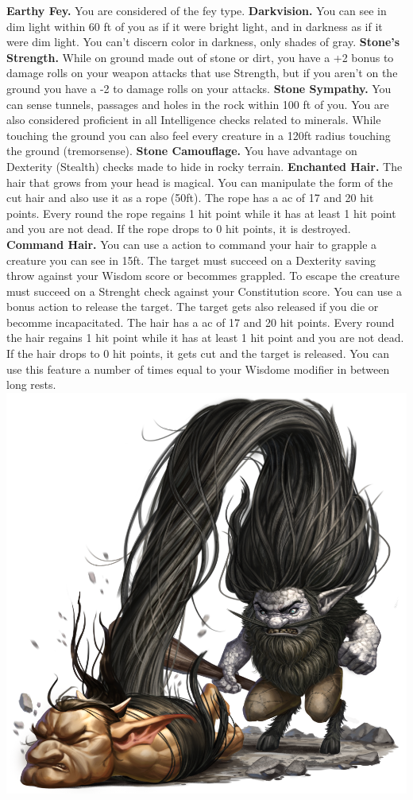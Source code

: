 \documentclass[a4paper,10pt,twoside,twocolumn]{dndbook} %
\begin{document}
	\textbf{Earthy Fey.} You are considered of the fey type.
	\textbf{Darkvision.} You can see in dim light within 60 ft of you as if it were bright light, and in darkness as if it were dim light. You can't discern color in darkness, only shades of gray.\linebreak
	\textbf{Stone's Strength.} While on ground made out of stone or dirt, you have a +2 bonus to damage rolls on your weapon attacks that use Strength, but if you aren't on the ground you have a -2 to damage rolls on your attacks.\linebreak
	\textbf{Stone Sympathy.} You can sense tunnels, passages and holes in the rock within 100 ft of you. You are also considered proficient in all Intelligence checks related to minerals. While touching the ground you can also feel every creature in a 120ft radius touching the ground (tremorsense).\vfill\pagebreak
	\textbf{Stone Camouflage.} You have advantage on Dexterity (Stealth) checks made to hide in rocky terrain.\linebreak
	\textbf{Enchanted Hair.} The hair that grows from your head is magical. You can manipulate the form of the cut hair and also use it as a rope (50ft). The rope has a ac of 17 and 20 hit points. Every round the rope regains 1 hit point while it has at least 1 hit point and you are not dead. If the rope drops to 0 hit points, it is destroyed. \linebreak
	\textbf{Command Hair.} You can use a action to command your hair to grapple a creature you can see in 15ft. The target must succeed on a Dexterity saving throw against your Wisdom score or becommes grappled. To escape the creature must succeed on a Strenght check against your Constitution score. You can use a bonus action to release the target. The target gets also released if you die or becomme incapacitated. The hair has a ac of 17 and 20 hit points. Every round the hair regains 1 hit point while it has at least 1 hit point and you are not dead. If the hair drops to 0 hit points, it gets cut and the target is released. You can use this feature a number of times equal to your Wisdome modifier in between long rests.
	\pagebreak
	\includegraphics[width=\linewidth]{korred.png}
\end{document}

